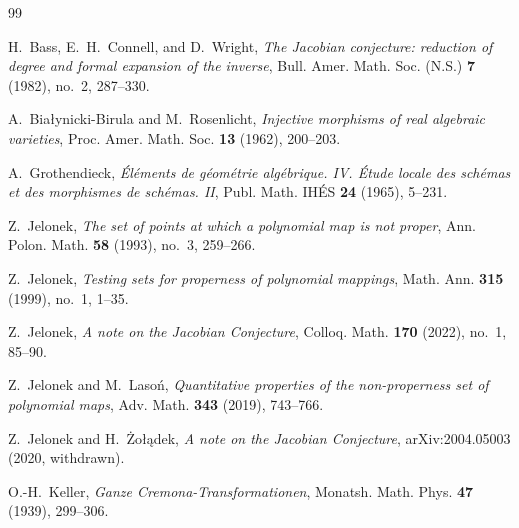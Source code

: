 \documentclass[11pt,reqno]{amsart}
\theoremstyle{plain}
\theoremstyle{definition}
\numberwithin{equation}{section}
\begin{document}
\begin{thebibliography}{99}

H.~Bass, E.~H.~Connell, and D.~Wright,
\emph{The Jacobian conjecture: reduction of degree and formal expansion of the inverse},
Bull. Amer. Math. Soc. (N.S.) \textbf{7} (1982), no.~2, 287--330.

A.~Bia{\l}ynicki-Birula and M.~Rosenlicht,
\emph{Injective morphisms of real algebraic varieties},
Proc. Amer. Math. Soc. \textbf{13} (1962), 200--203.

A.~Grothendieck,
\emph{\'{E}l\'{e}ments de g\'{e}om\'{e}trie alg\'{e}brique. IV. \'{E}tude locale des sch\'{e}mas et des morphismes de sch\'{e}mas. II},
Publ. Math. IH\'{E}S \textbf{24} (1965), 5--231.

Z.~Jelonek,
\emph{The set of points at which a polynomial map is not proper},
Ann. Polon. Math. \textbf{58} (1993), no.~3, 259--266.

Z.~Jelonek,
\emph{Testing sets for properness of polynomial mappings},
Math. Ann. \textbf{315} (1999), no.~1, 1--35.

Z.~Jelonek,
\emph{A note on the Jacobian Conjecture},
Colloq. Math. \textbf{170} (2022), no.~1, 85--90.

Z.~Jelonek and M.~Laso\'{n},
\emph{Quantitative properties of the non-properness set of polynomial maps},
Adv. Math. \textbf{343} (2019), 743--766.

Z.~Jelonek and H.~\.{Z}o{\l}\k{a}dek,
\emph{A note on the Jacobian Conjecture},
arXiv:2004.05003 (2020, withdrawn).

O.-H.~Keller,
\emph{Ganze Cremona-Transformationen},
Monatsh. Math. Phys. \textbf{47} (1939), 299--306.


\end{thebibliography}
\end{document}
